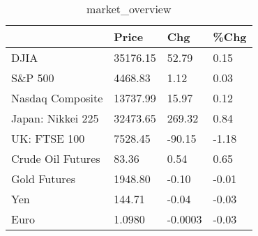 \documentclass{article}%
\begin{document}
%


\begin{table}[htbp]%
\caption{market\_overview}%
\centering%
\begin{adjustbox}{width=1\textwidth}%
\begin{tabular}{llll}
\toprule
                  &    Price &     Chg &  \%Chg \\
\midrule
             DJIA & 35176.15 &   52.79 &  0.15 \\
          S\&P 500 &  4468.83 &    1.12 &  0.03 \\
 Nasdaq Composite & 13737.99 &   15.97 &  0.12 \\
Japan: Nikkei 225 & 32473.65 &  269.32 &  0.84 \\
     UK: FTSE 100 &  7528.45 &  -90.15 & -1.18 \\
Crude Oil Futures &    83.36 &    0.54 &  0.65 \\
     Gold Futures &  1948.80 &   -0.10 & -0.01 \\
              Yen &   144.71 &   -0.04 & -0.03 \\
             Euro &   1.0980 & -0.0003 & -0.03 \\
\bottomrule
\end{tabular}
%
\end{adjustbox}%
\end{table}

%
\end{document}
